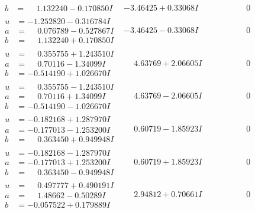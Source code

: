 \documentclass[1p]{elsarticle_modified}
\theoremstyle{definition}
\begin{document}
$$\begin{array}{c|c|c}
\begin{aligned}
b &= \phantom{-}1.132240 - 0.170850 I\end{aligned}
 & -3.46425 + 0.33068 I & \phantom{-0.000000 } 0 \\ \hline\begin{aligned}
u &= -1.252820 - 0.316784 I \\
a &= \phantom{-}0.076789 - 0.527867 I \\
b &= \phantom{-}1.132240 + 0.170850 I\end{aligned}
 & -3.46425 - 0.33068 I & \phantom{-0.000000 } 0 \\ \hline\begin{aligned}
u &= \phantom{-}0.355755 + 1.243510 I \\
a &= \phantom{-}0.70116 - 1.34099 I \\
b &= -0.514190 + 1.026670 I\end{aligned}
 & \phantom{-}4.63769 + 2.06605 I & \phantom{-0.000000 } 0 \\ \hline\begin{aligned}
u &= \phantom{-}0.355755 - 1.243510 I \\
a &= \phantom{-}0.70116 + 1.34099 I \\
b &= -0.514190 - 1.026670 I\end{aligned}
 & \phantom{-}4.63769 - 2.06605 I & \phantom{-0.000000 } 0 \\ \hline\begin{aligned}
u &= -0.182168 + 1.287970 I \\
a &= -0.177013 - 1.253200 I \\
b &= \phantom{-}0.363450 + 0.949948 I\end{aligned}
 & \phantom{-}0.60719 - 1.85923 I & \phantom{-0.000000 } 0 \\ \hline\begin{aligned}
u &= -0.182168 - 1.287970 I \\
a &= -0.177013 + 1.253200 I \\
b &= \phantom{-}0.363450 - 0.949948 I\end{aligned}
 & \phantom{-}0.60719 + 1.85923 I & \phantom{-0.000000 } 0 \\ \hline\begin{aligned}
u &= \phantom{-}0.497777 + 0.490191 I \\
a &= \phantom{-}1.48662 - 0.50289 I \\
b &= -0.057522 + 0.179889 I\end{aligned}
 & \phantom{-}2.94812 + 0.70661 I & \phantom{-0.000000 } 0 \\ \hline\begin{aligned}

\end{aligned}
\end{array}$$
\end{document}
